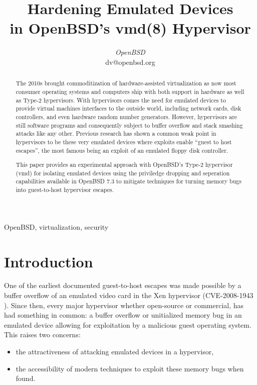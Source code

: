 \documentclass[conference]{IEEEtran}
\begin{document}
\title{Hardening Emulated Devices \\ in OpenBSD's vmd(8) Hypervisor}

\author{
\textit{OpenBSD}\\
dv@openbsd.org}

\maketitle

\begin{abstract}
The 2010s brought commoditization of hardware-assisted virtualization
as now most consumer operating systems and computers ship with both
support in hardware as well as Type-2 hypervisors. With hypervisors
comes the need for emulated devices to provide virtual machines
interfaces to the outside world, including network cards, disk
controllers, and even hardware random number generators. However,
hypervisors are still software programs and consequently subject to
buffer overflow and stack smashing attacks like any other. Previous
research has shown a common weak point in hypervisors to be these very
emulated devices where exploits enable ``guest to host escapes'', the
most famous being an exploit of an emulated floppy disk controller.

This paper provides an experimental approach with OpenBSD's Type-2
hypervisor (vmd) for isolating emulated devices using the priviledge
dropping and seperation capabilities available in OpenBSD 7.3 to
mitigate techniques for turning memory bugs into guest-to-host
hypervisor escapes.
\end{abstract}


\begin{IEEEkeywords}
OpenBSD, virtualization, security
\end{IEEEkeywords}

\section{Introduction}
One of the earliest documented guest-to-host escapes was made possible
by a buffer overflow of an emulated video card in the Xen hypervisor
(CVE-2008-1943 \cite{b1}). Since then, every major hypervisor whether
open-source or commercial, has had something in common: a buffer
overflow or unitialized memory bug in an emulated device allowing for
exploitation by a malicious guest operating system. This raises two
concerns:

\begin{itemize}
\item the attractiveness of attacking emulated devices in a hypervisor,
\item the accessibility of modern techniques to exploit these memory
  bugs when found.
\end{itemize}
\end{document}
